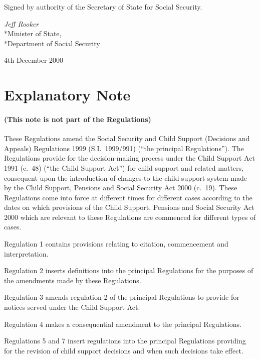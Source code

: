 \documentclass[12pt,a4paper]{article}
\begin{document}
\bigskip

Signed 
by authority of the Secretary of State for Social Security.

{\raggedleft
\emph{Jeff Rooker}\\*Minister of State,\\*Department of Social Security

}

4th December 2000

\small

\part{Explanatory Note}

\renewcommand\parthead{--- Explanatory Note}

\subsection*{(This note is not part of the Regulations)}

These Regulations amend the Social Security and Child Support (Decisions and Appeals) Regulations 1999 (S.I.\ 1999/991) (“the principal Regulations”). The Regulations provide for the decision-making process under the Child Support Act 1991 (c.\ 48) (“the Child Support Act”) for child support and related matters, consequent upon the introduction of changes to the child support system made by the Child Support, Pensions and Social Security Act 2000 (c.\ 19). These Regulations come into force at different times for different cases according to the dates on which provisions of the Child Support, Pensions and Social Security Act 2000 which are relevant to these Regulations are commenced for different types of cases.

Regulation 1 contains provisions relating to citation, commencement and interpretation.

Regulation 2 inserts definitions into the principal Regulations for the purposes of the amendments made by these Regulations.

Regulation 3 amends regulation 2 of the principal Regulations to provide for notices served under the Child Support Act.

Regulation 4 makes a consequential amendment to the principal Regulations.

Regulations 5 and 7 insert regulations into the principal Regulations providing for the revision of child support decisions and when such decisions take effect.
\end{document}

